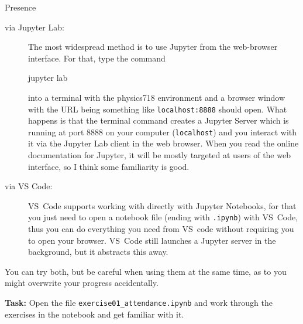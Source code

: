 \documentclass[a4paper, draft=False]{scrartcl}
\begin{document}
\begin{exam}[Presence]{Presence}
\begin{instructions}
\begin{problem*}
          \begin{description}
          \item[via Jupyter Lab:] The most widespread method is to use Jupyter from the web-browser
            interface. For that, type the command
            \begin{bashcode}
              jupyter lab
            \end{bashcode}
            into a terminal with the physics718 environment and a browser window
            with the URL being something like \texttt{localhost:8888} should open.
            What happens is that the terminal command creates a Jupyter Server which
            is running at port 8888 on your computer (\texttt{localhost}) and you
            interact with it via the Jupyter Lab client in the web browser. When you
            read the online documentation for Jupyter, it will be mostly targeted at
            users of the web interface, so I think some familiarity is good.
          \item[via VS Code:] VS~Code supports working with directly with Jupyter Notebooks, for
            that you just need to open a notebook file (ending with \texttt{.ipynb})
            with VS~Code, thus you can do everything you need from VS~code without
            requiring you to open your browser. VS~Code still launches a Jupyter
            server in the background, but it abstracts this away.
          \end{description}

          You can try both, but be careful when using them at the same time, as to
          you might overwrite your progress accidentally.

          \textbf{Task:} Open the file \texttt{exercise01\_attendance.ipynb} and
          work through the exercises in the notebook and get familiar with it.
        \end{problem*}
      \end{instructions}
    \end{exam}
\end{document}
